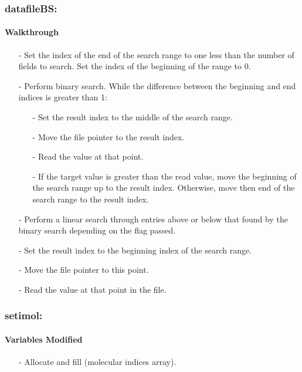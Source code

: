 \documentclass[letterpaper,12pt]{article}
\begin{document}
\subsubsection{datafileBS:}
\paragraph{Walkthrough}
\begin{enumerate}[leftmargin=10pt, noitemsep, parsep=0pt, topsep=0ex]
\item[-] Set the index of the end of the search range to one less than the number of fields to search. Set the index of the beginning of the range to 0.
\item[-] Perform binary search. While the difference between the beginning and end indices is greater than 1:
\begin{enumerate}[leftmargin=10pt, noitemsep, parsep=0pt, topsep=0ex]
\item[-] Set the result index to the middle of the search range.
\item[-] Move the file pointer to the result index.
\item[-] Read the value at that point.
\item[-] If the target value is greater than the read value, move the beginning of the search range up to the result index. Otherwise, move then end of the search range to the result index.
\end{enumerate}
\item[-] Perform a linear search through entries above or below that found by the binary search depending on the flag passed.
\item[-] Set the result index to the beginning index of the search range.
\item[-] Move the file pointer to this point.
\item[-] Read the value at that point in the file. 
\end{enumerate}

\subsubsection{setimol:}
\paragraph{Variables Modified}
\begin{enumerate}[leftmargin=10pt, noitemsep, parsep=0pt, topsep=0ex]
\item[-] Allocate and fill  (molecular indices array).
\end{enumerate}
\end{document}
